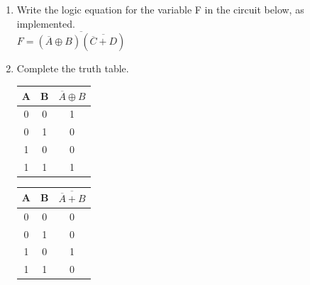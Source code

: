 \documentclass[12pt,letterpaper,titlepage]{report}
\begin{document}
	\begin{enumerate}[label=\alph*)]
	\item Write the logic equation for the variable F in the circuit below, as implemented.\\ 
	$ F = \overline{(\overline{A} \oplus B)  (\overline{\overline{C} + D})} $
	\item Complete the truth table.
	
	\begin{paracol}{3}     
	\switchcolumn
	\def\arraystretch{1.5} 
	\begin{tabular}{|c c|c|}          \hline
	A & B & $\overline{A} \oplus B$ \\\hline
	0 & 0 & 1                       \\\hline
	0 & 1 & 0                       \\\hline
	1 & 0 & 0                       \\\hline
	1 & 1 & 1                       \\\hline
	\end{tabular}\medskip
	
	\begin{tabular}{|c c|c|}                \hline
	A & B & $\overline{\overline{A} + B}$ \\\hline
	0 & 0 & 0                             \\\hline
	0 & 1 & 0                             \\\hline
	1 & 0 & 1                             \\\hline
	1 & 1 & 0                             \\\hline
	\end{tabular}	


\end{paracol}
\end{enumerate}
\end{document}
